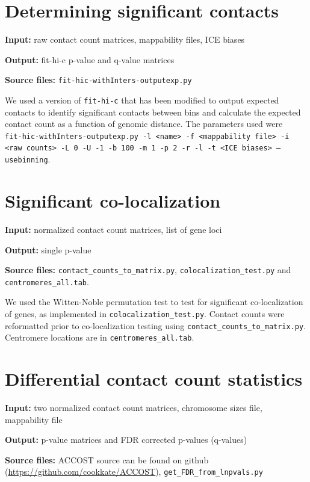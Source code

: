 \documentclass[11pt]{amsart}
\begin{document}
\section{Determining significant contacts}

\textbf{Input:} raw contact count matrices, mappability files, ICE biases

\textbf{Output:} fit-hi-c p-value and q-value matrices 

\textbf{Source files:} \texttt{fit-hic-withInters-outputexp.py}

We used a version of \texttt{fit-hi-c} that has been modified to output expected contacts to identify significant contacts between bins and calculate the expected contact count as a function of genomic distance. The parameters used were
\\
\texttt{fit-hic-withInters-outputexp.py -l <name> -f <mappability file> -i <raw counts> -L 0 -U -1 -b 100 -m 1 -p 2 -r -l -t <ICE biases> --usebinning}.

\section{Significant co-localization}

\textbf{Input:} normalized contact count matrices, list of gene loci

\textbf{Output:} single p-value 

\textbf{Source files:} \texttt{contact\_counts\_to\_matrix.py}, \texttt{colocalization\_test.py} and \texttt{centromeres\_all.tab}.

We used the Witten-Noble permutation test to test for significant co-localization of genes, as implemented in \texttt{colocalization\_test.py}. Contact counts were reformatted prior to co-localization testing using \texttt{contact\_counts\_to\_matrix.py}. Centromere locations are in \texttt{centromeres\_all.tab}.

\section{Differential contact count statistics}

\textbf{Input:} two normalized contact count matrices, chromosome sizes file, mappability file

\textbf{Output:} p-value matrices and FDR corrected p-values (q-values)

\textbf{Source files:} ACCOST source can be found on github (\url{https://github.com/cookkate/ACCOST}), \texttt{get\_FDR\_from\_lnpvals.py}
\end{document}
